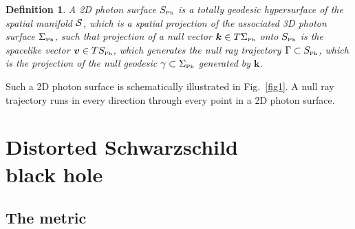 \documentclass[twocolumn,showpacs,preprintnumbers,amsmath,amssymb,floatfix,nofootinbib]{revtex4-1}
\newcommand{\ind}[1]{\mbox{\tiny #1}}
\newtheorem{definition}{Definition}
\begin{document}
\begin{definition}
A 2D photon surface $S_{\ind{Ph}}$ is a totally geodesic hypersurface of the spatial manifold ${\cal S}$, which is a spatial projection of the associated 3D photon surface $\Sigma_{\ind{Ph}}$, such that projection of a null vector ${\bm k}\in T\Sigma_{\ind{Ph}}$ onto $S_{\ind{Ph}}$ is the spacelike vector ${\bm v}\in TS_{\ind{Ph}}$, which generates the null ray trajectory $\Gamma\subset S_{\ind{Ph}}$, which is the projection of the null geodesic $\gamma\subset\Sigma_{\ind{Ph}}$ generated by ${\bm k}$.                         
\end{definition}
Such a 2D photon surface is schematically illustrated in Fig.~\ref{fig1}. A null ray trajectory runs in every direction through every point in a 2D photon surface. 

\section{Distorted Schwarzschild\\ black hole}

\subsection{The metric}
\end{document}
